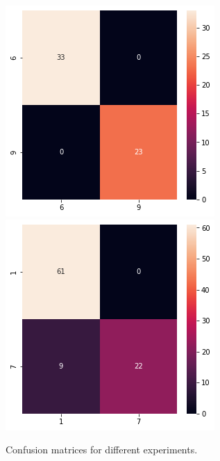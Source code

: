 \documentclass[a4paper,10pt]{report}
\begin{document}
\begin{figure}[!htb]
  \includegraphics[width=\linewidth]{6_9_cm.png}
  \endminipage\hfill
  \includegraphics[width=\linewidth]{1_7_cm.png}
  \endminipage\hfill
  \caption{Confusion matrices for different experiments.}
  \label{fig:binary_cls_cm_2}
\end{figure}
\end{document}
